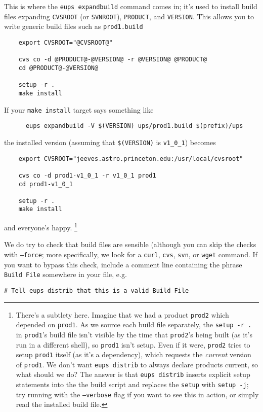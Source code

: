 \documentclass{article}
\newcommand{\code}[1]{\texttt{#1}}
\begin{document}
This is where the \code{eups expandbuild} command comes in;  it's used to install
build files expanding \code{CVSROOT} (or \code{SVNROOT}), \code{PRODUCT}, and
\code{VERSION}.  This allows you to write generic build files such as \code{prod1.build}
\begin{verbatim}
    export CVSROOT="@CVSROOT@"

    cvs co -d @PRODUCT@-@VERSION@ -r @VERSION@ @PRODUCT@
    cd @PRODUCT@-@VERSION@

    setup -r .
    make install
\end{verbatim}
If your \code{make install} target says something like
\begin{verbatim}
      eups expandbuild -V $(VERSION) ups/prod1.build $(prefix)/ups
\end{verbatim}
the installed version (assuming that \code{\$(VERSION)} is
\code{v1\_0\_1}) becomes
\begin{verbatim}
    export CVSROOT="jeeves.astro.princeton.edu:/usr/local/cvsroot"

    cvs co -d prod1-v1_0_1 -r v1_0_1 prod1
    cd prod1-v1_0_1

    setup -r .
    make install  
\end{verbatim}
and everyone's happy.  \footnote{
There's a subtlety here.  Imagine that we had a product \code{prod2}
which depended on \code{prod1}.
As we source each build file separately,
the \code{setup -r .} in \code{prod1}'s build file isn't visible by
the time that \code{prod2}'s being built (as it's run in a different shell), so
\code{prod1} isn't setup.  Even if it were, \code{prod2}
tries to setup \code{prod1} itself (as it's a dependency), which requests the \emph{current} version
of \code{prod1}.  We don't want \code{eups distrib} to always declare
products current, so what should we do?  The answer is that \code{eups distrib}
inserts explicit setup statements into the the build script
and replaces the \code{setup} with \code{setup -j}; try
running with the \code{--verbose} flag if you want to see this in action,
or simply read the installed build file.
}

We do try to check that build files are sensible (although you can skip the
checks with \code{--force};  more specifically, we look for a \code{curl},
\code{cvs}, \code{svn}, or \code{wget} command.  If you want to bypass
this check, include a comment line containing the phrase \code{Build File}
somewhere in your file, e.g.
\begin{verbatim}
# Tell eups distrib that this is a valid Build File
\end{verbatim}
\end{document}
